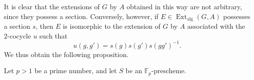It is clear that the extensions of \(G\) by \(A\) obtained in
this way are not arbitrary, since they possess a section.
Conversely, however, if
\(E\in\operatorname{Ext}_{\mathrm{alg}}(G,A)\) possesses a
section \(s\), then \(E\) is isomorphic to the extension of
\(G\) by \(A\) associated with the \(2\)-cocycle \(u\) such that
\[
  u(g,g')=s(g)s(g')s(gg')^{-1}.
\]
We thus obtain the following proposition.



Let \(p>1\) be a prime number, and let \(S\) be an
\(\mathbb F_p\)-prescheme.
